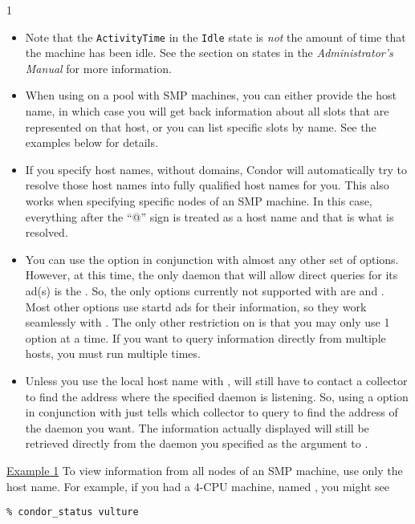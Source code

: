 \begin{ManPage}{\label{man-condor-status}}{1}
\begin{itemize}
	\item Note that the \texttt{ActivityTime} in the \texttt{Idle} state is
	\emph{not} the amount of time that the machine has been idle.  See the
	section on  states in the \emph{Administrator's Manual}
	for more information.

	\item When using  on a pool with SMP machines,
	you can either provide the host name, in which case you will
	get back information about all slots that are represented on
	that host, or you can list specific slots by name.
	See the examples below for details.

	\item If you specify host names, without domains, Condor will
	automatically try to resolve those host names into fully
	qualified host names for you.
	This also works when specifying specific nodes of an SMP
	machine.
	In this case, everything after the ``@'' sign is treated as a
	host name and that is what is resolved.

	\item You can use the  option in conjunction with
	almost any other set of options.
	However, at this time, the only daemon that will allow direct
	queries for its ad(s) is the .
	So, the only options currently not supported with
	 are  and .
	Most other options use startd ads for their information, so
	they work seamlessly with .
	The only other restriction on  is that you may
	only use 1  option at a time.
	If you want to query information directly from multiple hosts,
	you must run  multiple times.

	\item Unless you use the local host name with ,
	 will still have to contact a collector to find
	the address where the specified daemon is listening.
	So, using a  option in conjunction with
	 just tells  which collector to
	query to find the address of the daemon you want.
	The information actually displayed will still be retrieved
	directly from the daemon you specified as the argument to
	.

\end{itemize}

\Examples

\underline{Example 1} To view information from all nodes of an SMP
machine, use only the host name.
For example, if you had a 4-CPU machine, named
, you might see
\footnotesize
\begin{verbatim}
% condor_status vulture


\end{verbatim}
\end{ManPage}
